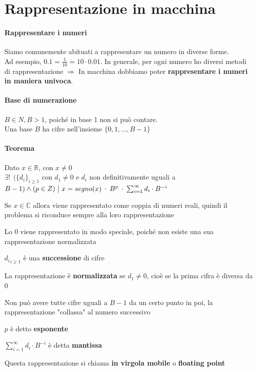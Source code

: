 \documentclass[10pt]{book}
\begin{document}
\section{Rappresentazione in macchina}
\paragraph{Rappresentare i numeri} Siamo comunemente abituati a rappresentare un numero in diverse forme.\\
Ad esempio, $0.1 = \frac{1}{10} = 10 \cdot 0.01$. In generale, per ogni numero ho diversi metodi di rappresentazione $\Rightarrow$ In macchina dobbiamo poter \textbf{rappresentare i numeri in maniera univoca}.
\paragraph{Base di numerazione} $B \in N, B > 1$, poiché in base 1 non si può contare.\\Una base $B$ ha cifre nell'insieme $\{0, 1, \ldots, B - 1\}$
\paragraph{Teorema} Dato $x \in \mathbb{R}$, con $x \neq 0$\\$\exists!\:\:(\{d_i\}_{i \geq 1}$ con $d_1 \neq 0$ e $d_i$ non definitivamente uguali a $B - 1) \wedge (p \in Z) \:\:\vline\:\: x = segno(x)\:\cdot\:B^p\:\cdot\:\sum_{i=1}^\infty d_i \cdot B^{-i}$
\begin{list}{}{Considerazioni}
	\item Se $x \in \mathbb{C}$ allora viene rappresentato come coppia di numeri reali, quindi il problema si riconduce sempre alla loro rappresentazione
	\item Lo $0$ viene rappresentato in modo speciale, poiché non esiste una sua rappresentazione normalizzata
	\item ${d_i}_{i \geq 1}$ è una \textbf{successione} di cifre
	\item La rappresentazione è \textbf{normalizzata} se $d_1 \neq 0$, cioè se la prima cifra è diversa da 0
	\item Non può avere tutte cifre uguali a $B-1$ da un certo punto in poi, la rappresentazione "collassa" al numero successivo
	\item $p$ è detto \textbf{esponente}
	\item $\sum_{i=1}^\infty d_i \cdot B^{-i}$ è detta \textbf{mantissa}
	\item Questa rappresentazione si chiama \textbf{in virgola mobile} o \textbf{floating point}
\end{list}
\begin{center}
\end{center} %
\pagebreak
\end{document}
